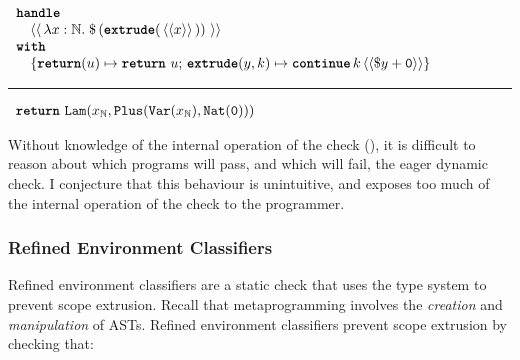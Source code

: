 \begin{code}
  \begin{efflst}
    $\begin{array}{l}
      \textbf{\texttt{handle}} \\
      \quad \equote[\, {\lambda x:\mathbb{N}.\; \splice[\, {(\textbf{\texttt{extrude}}(\, \equote[x] \, ))}\, ]} \, ] \\
      \textbf{\texttt{with}} \\
      \quad \{ \textbf{\texttt{return}}(u) \mapsto \return{u}; \, \textbf{\texttt{extrude}}(y, k) \mapsto { {\continue{k}{\equote[{\splice[y]+\texttt{0}}]}}} \}\\
    \end{array}$

    \vspace{2mm} 
\textcolor{effComment}{\hrule height 0.2mm \relax}
\vspace{2mm} 

\textcolor{effComment}{$\begin{array}{l}\return{\Lam{\Binder{x}{\mathbb{N}}}{\texttt{Plus}(\Var{x}{\mathbb{N}}, \texttt{Nat}(\texttt{0}))}}\end{array}$}

\end{efflst}
%
\label{listing:efflang-maybe-not-scope-extrusion}
\end{code}

Without knowledge of the internal operation of the check (), it is difficult to reason about which programs will pass, and which will fail, the eager dynamic check. I conjecture that this behaviour is unintuitive, and exposes too much of the internal operation of the check to the programmer. 

\subsubsection{Refined Environment Classifiers}\label{subsubsection:refined-environment-classifiers}
Refined environment classifiers are a static check that uses the type system to prevent scope extrusion. Recall that metaprogramming involves the \textit{creation} and \textit{manipulation} of ASTs. Refined environment classifiers prevent scope extrusion by checking that:

